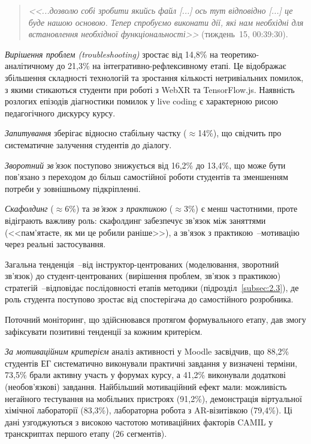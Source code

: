 \begin{quote}
\textit{<<...дозволю собі зробити якийсь файл \textnormal{[...]} ось тут відповідно \textnormal{[...]} це буде нашою основою. Тепер спробуємо виконати дії, які нам необхідні для встановлення необхідної функціональності>>} (тиждень~15, 00:39:30).
\end{quote}

\textit{Вирішення проблем (troubleshooting)} зростає від 14,8\% на теоретико-аналітичному до 21,3\% на інтегративно-рефлексивному етапі. Це відображає збільшення складності технологій та зростання кількості нетривіальних помилок, з якими стикаються студенти при роботі з WebXR та TensorFlow.js. Наявність розлогих епізодів діагностики помилок у live coding є характерною рисою педагогічного дискурсу курсу.

\textit{Запитування} зберігає відносно стабільну частку ($\approx$14\%), що свідчить про систематичне залучення студентів до діалогу.

\textit{Зворотний зв'язок} поступово знижується від 16,2\% до 13,4\%, що може бути пов'язано з переходом до більш самостійної роботи студентів та зменшенням потреби у зовнішньому підкріпленні.

\textit{Скафолдинг} ($\approx$6\%) та \textit{зв'язок з практикою} ($\approx$3\%) є менш частотними, проте відіграють важливу роль: скафолдинг забезпечує зв'язок між заняттями (<<пам'ятаєте, як ми це робили раніше>>), а зв'язок з практикою~--мотивацію через реальні застосування.

Загальна тенденція~--від інструктор-центрованих (моделювання, зворотний зв'язок) до студент-центрованих (вирішення проблем, зв'язок з практикою) стратегій~--відповідає послідовності етапів методики (підрозділ~\ref{subsec:2.3}), де роль студента поступово зростає від спостерігача до самостійного розробника.


Поточний моніторинг, що здійснювався протягом формувального етапу, дав змогу зафіксувати позитивні тенденції за кожним критерієм.

\textit{За мотиваційним критерієм} аналіз активності у Moodle засвідчив, що 88,2\% студентів ЕГ систематично виконували практичні завдання у визначені терміни, 73,5\% брали активну участь у форумах курсу, а 41,2\% виконували додаткові (необов'язкові) завдання. Найбільший мотиваційний ефект мали: можливість негайного тестування на мобільних пристроях (91,2\%), демонстрація віртуальної хімічної лабораторії (83,3\%), лабораторна робота з AR-візитівкою (79,4\%). Ці дані узгоджуються з високою частотою мотиваційних факторів CAMIL у транскриптах першого етапу (26 сегментів).

